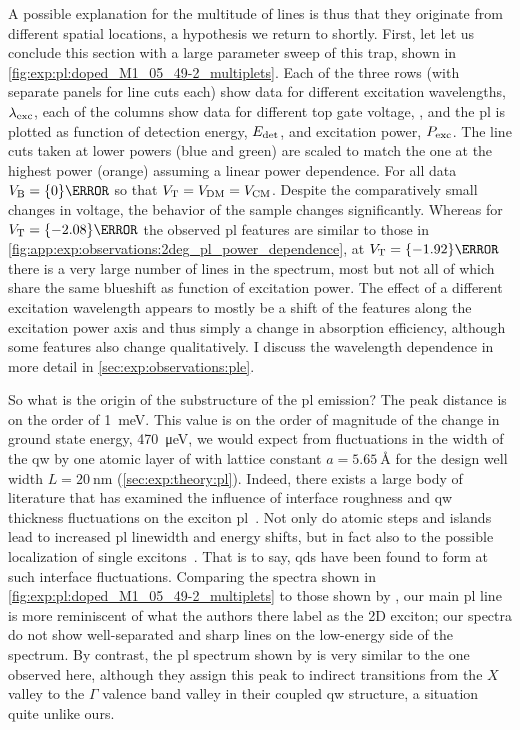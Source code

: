 A possible explanation for the multitude of lines is thus that they originate from different spatial locations, a hypothesis we return to shortly.
First, let let us conclude this section with a large parameter sweep of this trap, shown in \cref{fig:exp:pl:doped_M1_05_49-2_multiplets}.
Each of the three rows (with separate panels for line cuts each) show data for different excitation wavelengths, $\lambda_{\mathrm{exc}}$, each of the columns show data for different top gate voltage, \VT, and the \gls{pl} is plotted as function of detection energy, $E_{\mathrm{det}}$, and excitation power, $P_{\mathrm{exc}}$.
The line cuts taken at lower powers (blue and green) are scaled to match the one at the highest power (orange) assuming a linear power dependence.
For all data $\VB = \qty{0}{\volt}$ so that $V_{\mathrm{T}} = V_{\mathrm{DM}} = V_{\mathrm{CM}}$.
Despite the comparatively small changes in voltage, the behavior of the sample changes significantly.
Whereas for $\VT = \qty{-2.08}{\volt}$ the observed \gls{pl} features are similar to those in \cref{fig:app:exp:observations:2deg_pl_power_dependence},
at $\VT = \qty{-1.92}{\volt}$ there is a very large number of lines in the spectrum, most but not all of which share the same blueshift as function of excitation power.
The effect of a different excitation wavelength appears to mostly be a shift of the features along the excitation power axis and thus simply a change in absorption efficiency, although some features also change qualitatively.
I discuss the wavelength dependence in more detail in \cref{sec:exp:observations:ple}.

So what is the origin of the substructure of the \gls{pl} emission?
The peak distance is on the order of \qty{1}{\milli\electronvolt}.
This value is on the order of magnitude of the change in ground state energy, \qty{470}{\micro\electronvolt}, we would expect from fluctuations in the width of the \gls{qw} by one atomic layer of  with lattice constant $a = \qty{5.65}{\angstrom}$
for the design well width $L = \qty{20}{\nano\meter}$ (\cref{sec:exp:theory:pl}).
Indeed, there exists a large body of literature that has examined the influence of interface roughness and \gls{qw} thickness fluctuations on the exciton \gls{pl}~\cite{Tanaka1987,Gammon1991,Leosson2000}.
Not only do atomic steps and islands lead to increased \gls{pl} linewidth and energy shifts, but in fact also to the possible localization of single excitons~\cite{Brunner1994,Brunner1994a,Zrenner1994}.
That is to say, \glspl{qd} have been found to form at such interface fluctuations.
Comparing the spectra shown in \cref{fig:exp:pl:doped_M1_05_49-2_multiplets} to those shown by \citet[Figure~1]{Brunner1994}, our main \gls{pl} line is more reminiscent of what the authors there label as the 2D exciton; our spectra do not show well-separated and sharp lines on the low-energy side of the spectrum.
By contrast, the \gls{pl} spectrum shown by \citet[Figure~1]{Zrenner1994} is very similar to the one observed here, although they assign this peak to indirect transitions from the  $X$ valley to the  $\Gamma$ valence band valley in their  coupled \gls{qw} structure, a situation quite unlike ours.

